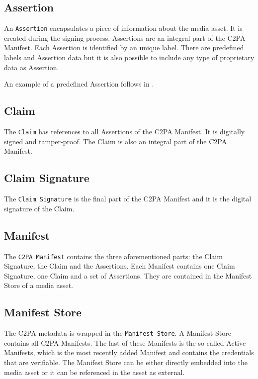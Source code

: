 \subsection{Assertion}

An \texttt{Assertion} encapsulates a piece of information about the media asset. It is created during the signing process. Assertions are an integral part of the C2PA Manifest. Each Assertion is identified by an unique label. There are predefined labels and Assertion data but it is also possible to include any type of proprietary data as Assertion. 

An example of a predefined Assertion follows in .

\subsection{Claim}

The \texttt{Claim} has references to all Assertions of the C2PA Manifest. It is digitally signed and tamper-proof. The Claim is also an integral part of the C2PA Manifest.

\subsection{Claim Signature}

The \texttt{Claim Signature} is the final part of the C2PA Manifest and it is the digital signature of the Claim.

\subsection{Manifest}

The \texttt{C2PA Manifest} contains the three aforementioned parts: the Claim Signature, the Claim and the Assertions. Each Manifest contains one Claim Signature, one Claim and a set of Assertions. They are contained in the Manifest Store of a media asset.

\subsection{Manifest Store}

The C2PA metadata is wrapped in the \texttt{Manifest Store}. A Manifest Store contains all C2PA Manifests. The last of these Manifests is the so called Active Manifests, which is the most recently added Manifest and contains the credentials that are verifiable. The Manifest Store can be either directly embedded into the media asset or it can be referenced in the asset as external.

